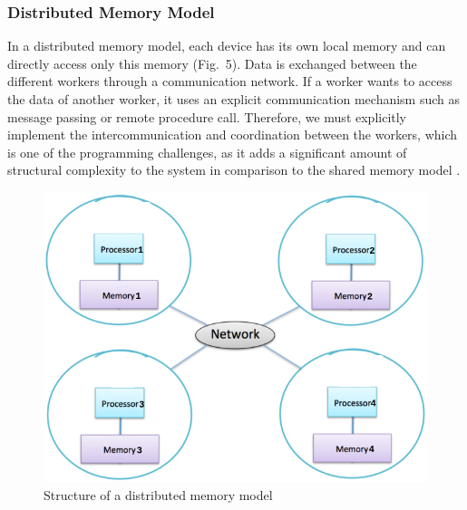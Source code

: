 \documentclass[ieeetran]{article}
\begin{document}
\subsubsection{Distributed Memory Model} %
\label{ssub:distributed_memory_model}
In a distributed memory model, each device has its own local memory and can directly access only this memory (Fig.\ 5). Data is exchanged between the different workers through a communication network. If a worker wants to access the data of another worker, it uses an explicit communication mechanism such as message passing or remote procedure call. Therefore, we must explicitly implement the intercommunication and coordination between the workers, which is one of the programming challenges, as it adds a significant amount of structural complexity to the system in comparison to the shared memory model \cite{third}. 

\begin{figure}[h!]
  \centering
  \includegraphics[width=0.4\linewidth]{distributedmemorymodel}
  \caption{Structure of a distributed memory model}
  \label{fig:distributedmemorymodel}
\end{figure}
\end{document}
